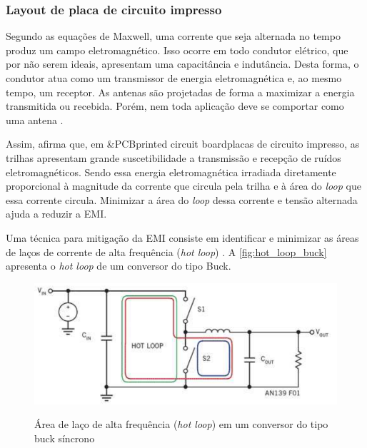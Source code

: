             \subsubsection{Layout de placa de circuito impresso} \label{cap:fund_emc_conv_mitig_cond}
            
            Segundo as equações de Maxwell, uma corrente que seja alternada no tempo produz um campo eletromagnético. Isso ocorre em todo condutor elétrico, que por não serem ideais, apresentam uma capacitância e indutância. Desta forma, o condutor atua como um transmissor de energia eletromagnética e, ao mesmo tempo, um receptor. As antenas são projetadas de forma a maximizar a energia transmitida ou recebida. Porém, nem toda aplicação deve se comportar como uma antena \cite{ref:EMC_artigo_Texas}.
            
            Assim,  afirma que, em \abreviatura&{PCB}{printed circuit board}{placas de circuito impresso}, as trilhas apresentam grande suscetibilidade a transmissão e recepção de ruídos eletromagnéticos. Sendo essa energia eletromagnética irradiada diretamente proporcional à magnitude da corrente que circula pela trilha e à área do \textit{loop} que essa corrente circula. Minimizar a área do \textit{loop} dessa corrente e tensão alternada ajuda a reduzir a EMI.
            
            Uma técnica para mitigação da EMI consiste em identificar e minimizar as áreas de laços de corrente de alta frequência (\textit{hot loop}) \cite{ref:EMC_HotLoop_kueck}. A \autoref{fig:hot_loop_buck} apresenta o \textit{hot loop} de um conversor do tipo Buck. 
            
            \begin{figure}[H]
            	\centering
            	\caption{Área de laço de alta frequência (\textit{hot loop}) em um conversor do tipo buck síncrono}
            	\includegraphics[scale=1]{pdf/outros/hotloop.pdf}
            	\label{fig:hot_loop_buck}
            \end{figure}
            
